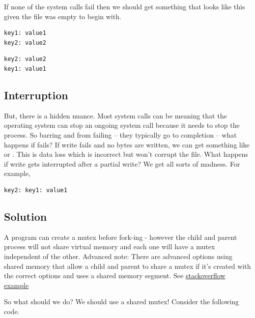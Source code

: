 If none of the system calls fail then we should get something that looks like this given the file was empty to begin with.

\begin{lstlisting}
key1: value1
key2: value2
\end{lstlisting}

\begin{lstlisting}
key2: value2
key1: value1
\end{lstlisting}

\subsection{Interruption}

But, there is a hidden nuance.
Most system calls can be  meaning that the operating system can stop an ongoing system call because it needs to stop the process.
So barring    and  from failing -- they typically go to completion -- what happens if  fails? If write fails and no bytes are written, we can get something like  or .
This is data loss which is incorrect but won't corrupt the file.
What happens if write gets interrupted after a partial write? We get all sorts of madness.
For example,

\begin{lstlisting}
key2: key1: value1
\end{lstlisting}

\subsection{Solution}

A program can create a mutex before fork-ing - however the child and parent process will not share virtual memory and each one will have a mutex independent of the other.
Advanced note: There are advanced options using shared memory that allow a child and parent to share a mutex if it's created with the correct options and uses a shared memory segment.
See \href{http://stackoverflow.com/questions/19172541/procs-fork-and-mutexes}{stackoverflow example}

So what should we do? We should use a shared mutex! Consider the following code.

